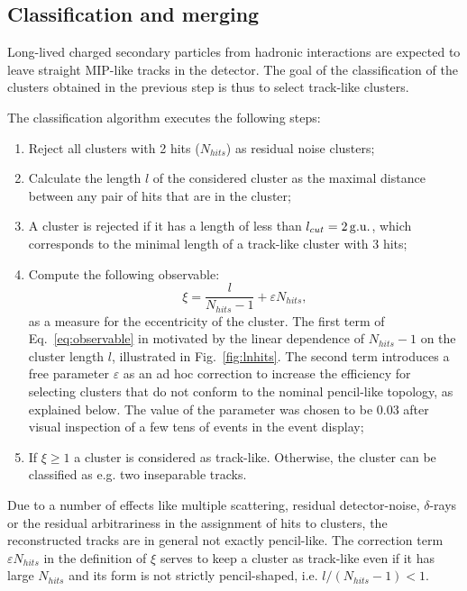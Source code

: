 
\subsection{Classification and merging}
\label{sec:class}
Long-lived charged secondary particles from hadronic interactions are expected to leave straight MIP-like tracks in the detector.
The goal of the classification of the clusters obtained in the previous step is thus to select track-like clusters. %

The classification algorithm executes the following steps:
\begin{enumerate}
	\item Reject all clusters with 2 hits ($N_{hits}$) as residual noise clusters;
	\item Calculate the length $l$ of the considered cluster as the maximal distance between any pair of hits that are in the cluster;
	\item A cluster is rejected if it has a length of less than $l_{cut} = 2\,{\rm g. u.}$, which corresponds to the minimal length of a track-like cluster with 3 hits; 
	\item Compute  the following observable:
	\begin{equation}
	\label{eq:observable}
	\xi = \frac{l}{N_{hits}-1} + \varepsilon N_{hits},
	\end{equation}
	as a measure for the eccentricity of the cluster. 
	The first term of Eq.~\ref{eq:observable} in motivated by the linear dependence of $N_{hits}-1$ on the cluster length $l$, illustrated in Fig.~\ref{fig:lnhits}.
	The second term introduces a free parameter $\varepsilon$ as an ad hoc correction to increase the efficiency for selecting clusters that do not conform to the nominal pencil-like topology, as explained below.
	The value of the parameter was chosen to be $0.03$ after visual inspection of a few tens of events in the event display;
	\item If $\xi \geq 1$ a cluster is considered as track-like. Otherwise, the cluster can be classified as e.g. two inseparable tracks.
\end{enumerate}
Due to a number of effects like multiple scattering, residual detector-noise, $\delta$-rays or the residual arbitrariness in the assignment of hits to clusters, the reconstructed tracks are in general not exactly pencil-like.  
The correction term $\varepsilon N_{hits}$ in the definition of $\xi$ serves to keep a cluster as track-like even if it has large $N_{hits}$ and its form is not strictly pencil-shaped, i.e. $l / (N_{hits}-1) < 1$.

